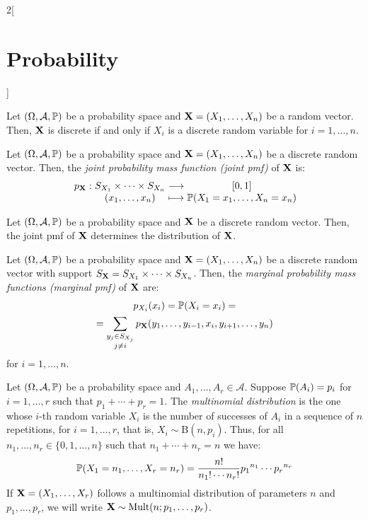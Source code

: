 \documentclass[../../../main.tex]{subfiles}
\begin{document}
\begin{multicols}{2}[\section{Probability}]
\begin{definition}
  \end{definition}
  \begin{prop}
    Let $(\Omega,\mathcal{A},\mathbb{P})$ be a probability space and $\boldsymbol{\mathrm{X}}=(X_1,\ldots,X_n)$ be a random vector. Then, $\boldsymbol{\mathrm{X}}$ is discrete if and only if $X_i$ is a discrete random variable for $i=1,\ldots,n$.
  \end{prop}
  \begin{definition}
    Let $(\Omega,\mathcal{A},\mathbb{P})$ be a probability space and $\boldsymbol{\mathrm{X}}=(X_1,\ldots,X_n)$ be a discrete random vector. Then, the \textit{joint probability mass function (joint pmf)} of $\boldsymbol{\mathrm{X}}$ is:
    $$
      \function{p_{\vectorfunction{X}}}{S_{X_1}\times\cdots\times S_{X_n}}{[0,1]}{(x_1,\ldots,x_n)}{\Prob(X_1=x_1,\ldots,X_n=x_n)}
    $$
  \end{definition}
  \begin{prop}
    Let $(\Omega,\mathcal{A},\mathbb{P})$ be a probability space and $\boldsymbol{\mathrm{X}}$ be a discrete random vector. Then, the joint pmf of $\boldsymbol{\mathrm{X}}$ determines the distribution of $\boldsymbol{\mathrm{X}}$.
  \end{prop}
  \begin{definition}
    Let $(\Omega,\mathcal{A},\mathbb{P})$ be a probability space and $\boldsymbol{\mathrm{X}}=(X_1,\ldots,X_n)$ be a discrete random vector with support $S_{\boldsymbol{\mathrm{X}}}=S_{X_1}\times\cdots\times S_{X_n}$. Then, the \textit{marginal probability mass functions (marginal pmf)} of $\boldsymbol{\mathrm{X}}$ are:
    \begin{multline*}
      p_{X_i}(x_i)=\mathbb{P}(X_i=x_i)=\\=\sum_{\substack{y_j\in S_{X_j}\\j\ne i}}p_{\boldsymbol{\mathrm{X}}}(y_1,\ldots,y_{i-1},x_i,y_{i+1},\ldots,y_n)
    \end{multline*}
    for $i=1,\ldots,n$.
  \end{definition}
  \begin{definition}
    Let $(\Omega,\mathcal{A},\mathbb{P})$ be a probability space and $A_1,\ldots,A_r\in\mathcal{A}$. Suppose $\mathbb{P}(A_i)=p_i$ for $i=1,\ldots,r$ such that $p_1+\cdots+p_r=1$. The \textit{multinomial distribution} is the one whose $i$-th random variable $X_i$ is the number of successes of $A_i$ in a sequence of $n$ repetitions, for $i=1,\ldots,r$, that is, $X_i\sim\text{B}(n,p_i)$. Thus, for all $n_1,\ldots,n_r\in\{0,1,\ldots,n\}$ such that $n_1+\cdots+n_r=n$ we have: $$\mathbb{P}(X_1=n_1,\ldots,X_r=n_r)=\frac{n!}{n_1!\cdots n_r!} {p_1}^{n_1}\cdots{p_r}^{n_r}$$ If $\boldsymbol{\mathrm{X}}=(X_1,\ldots,X_r)$ follows a multinomial distribution of parameters $n$ and $p_1,\ldots,p_r$, we will write $\boldsymbol{\mathrm{X}}\sim \text{Mult}(n;p_1,\ldots,p_r)$.

\end{definition}
\end{multicols}
\end{document}
